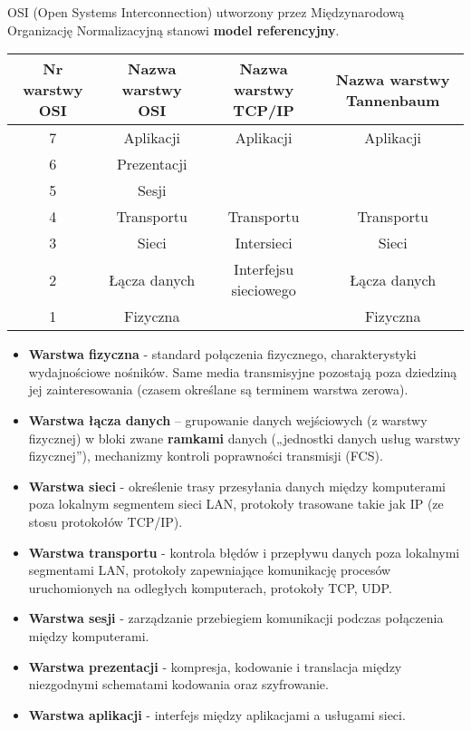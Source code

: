 \documentclass[../main.tex]{subfiles}
\begin{document}
    OSI (Open Systems Interconnection) utworzony przez Międzynarodową Organizację
    Normalizacyjną stanowi \textbf{model referencyjny}.


    \begin{tabular}{|c|c|c|c| }
        \hline
        Nr warstwy OSI & Nazwa warstwy OSI & Nazwa warstwy TCP/IP & Nazwa warstwy Tannenbaum\\
        \hline
        7 & Aplikacji & Aplikacji & Aplikacji\\
        6 & Prezentacji & & \\
        5 & Sesji & & \\
        \hline
        4 & Transportu & Transportu & Transportu\\
        \hline
        3 & Sieci & Intersieci & Sieci\\
        \hline
        2 & Łącza danych & Interfejsu sieciowego & Łącza danych\\

        1 & Fizyczna & & Fizyczna\\
        \hline
    \end{tabular}

    \begin{itemize}
        \item \textbf{Warstwa fizyczna} - standard połączenia fizycznego, charakterystyki wydajnościowe nośników. Same media transmisyjne pozostają poza dziedziną jej
        zainteresowania (czasem określane są terminem warstwa zerowa).
        \item \textbf{Warstwa łącza danych} – grupowanie danych wejściowych (z warstwy fizycznej) w bloki zwane \textbf{ramkami} danych („jednostki
        danych usług warstwy fizycznej”), mechanizmy kontroli poprawności
        transmisji (FCS).
        \item \textbf{Warstwa sieci} - określenie trasy przesyłania
        danych między komputerami poza lokalnym segmentem sieci LAN, protokoły trasowane takie jak IP (ze stosu protokołów TCP/IP).
        \item \textbf{Warstwa transportu} - kontrola błędów i przepływu danych
        poza lokalnymi segmentami LAN, protokoły zapewniające
        komunikację procesów uruchomionych na odległych komputerach, protokoły TCP, UDP.
        \item \textbf{Warstwa sesji} - zarządzanie przebiegiem komunikacji podczas
        połączenia między komputerami.
        \item \textbf{Warstwa prezentacji} - kompresja, kodowanie i
        translacja między niezgodnymi schematami kodowania oraz szyfrowanie.
        \item \textbf{Warstwa aplikacji} - interfejs między aplikacjami a
        usługami sieci.
    \end{itemize}
\end{document}
